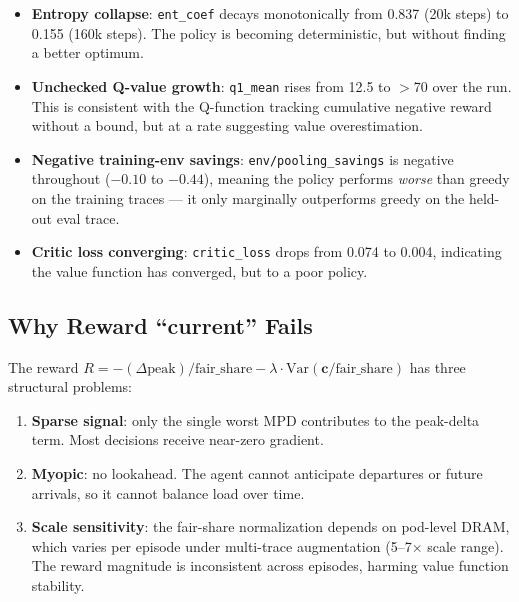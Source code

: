 \documentclass[11pt]{article}
\begin{document}
\begin{itemize}
  \item \textbf{Entropy collapse}: \texttt{ent\_coef} decays
        monotonically from 0.837 (20k steps) to 0.155 (160k steps).
        The policy is becoming deterministic, but without finding a
        better optimum.
  \item \textbf{Unchecked Q-value growth}: \texttt{q1\_mean} rises
        from 12.5 to $>$70 over the run. This is consistent with
        the Q-function tracking cumulative negative reward without a
        bound, but at a rate suggesting value overestimation.
  \item \textbf{Negative training-env savings}: \texttt{env/pooling\_savings}
        is negative throughout ($-0.10$ to $-0.44$), meaning the
        policy performs \textit{worse} than greedy on the training
        traces --- it only marginally outperforms greedy on the
        held-out eval trace.
  \item \textbf{Critic loss converging}: \texttt{critic\_loss} drops
        from 0.074 to 0.004, indicating the value function has
        converged, but to a poor policy.
\end{itemize}

\subsection{Why Reward ``current'' Fails}

The reward $R = -(\Delta\text{peak})/\text{fair\_share} - \lambda\cdot\text{Var}(\mathbf{c}/\text{fair\_share})$
has three structural problems:

\begin{enumerate}
  \item \textbf{Sparse signal}: only the single worst MPD contributes
        to the peak-delta term. Most decisions receive near-zero gradient.
  \item \textbf{Myopic}: no lookahead. The agent cannot anticipate
        departures or future arrivals, so it cannot balance load
        over time.
  \item \textbf{Scale sensitivity}: the fair-share normalization depends
        on pod-level DRAM, which varies per episode under multi-trace
        augmentation (5--7$\times$ scale range). The reward magnitude
        is inconsistent across episodes, harming value function stability.
\end{enumerate}

\end{document}

